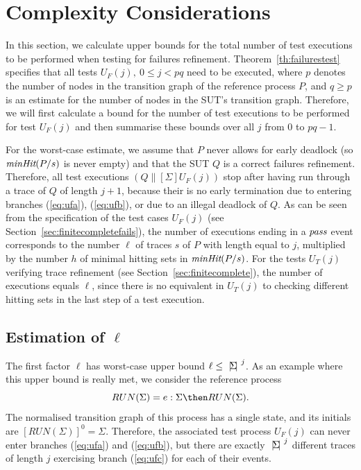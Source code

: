 \section{Complexity Considerations}
\label{sec:complexity}

In this section, we calculate upper bounds for the total number of test
executions to be performed when testing for failures refinement.
Theorem~\ref{th:failurestest} specifies that all tests $U_F(j),\ 0\le j < pq$
need to be executed, where $p$ denotes the number of nodes in the transition
graph of the reference process $P$, and $q\ge p$ is an estimate for the
number of nodes in the SUT's transition graph. Therefore, we will first
calculate a bound for the number of test executions to be performed for test
$U_F(j)$ and then summarise  these bounds over all $j$ from $0$ to $pq-1$.

For the worst-case estimate, we assume that $P$ never allows for early
deadlock (so $\text{\it minHit}(P/s)$ is never empty) and that the SUT $Q$ is a
correct failures refinement. Therefore, all test executions
$(Q\parallel[\Sigma] U_F(j))$ stop after having run through a trace of $Q$ of
length $j+1$, because their is no early termination due to entering branches
(\ref{eq:ufa}), (\ref{eq:ufb}), or due to an illegal deadlock of $Q$. As can
be seen from the specification of the test cases $U_F(j)$ (see
Section~\ref{sec:finitecompletefails}), the number of executions ending in a
${\text{\it pass}}$ event corresponds to the number $\ell$ of traces $s$ of $P$ with
length equal to $j$, multiplied by the number $h$ of minimal hitting sets in
$\text{\it minHit}(P/s)$. For the tests $U_T(j)$ verifying trace refinement (see
Section~\ref{sec:finitecomplete}), the number of executions equals $\ell$,
since there is no equivalent in $U_T(j)$ to checking different hitting sets
in the last step of a test execution.  

\subsection{Estimation of $\ell$}
The first factor $\ell$ has worst-case upper bound $\ell\le {~|\! \Sigma\!|~}^j$.
As an example where this upper bound is really met, we consider the reference
process
\[
RUN(\Sigma) = e:\Sigma \then RUN(\Sigma).
\]
The normalised transition graph of this process has a single state, and its initials
are $[RUN(\Sigma)]^0 = \Sigma$. Therefore, the associated test process $U_F(j)$ can
never enter branches (\ref{eq:ufa}) and (\ref{eq:ufb}), but there are exactly
${~|\! \Sigma\!|~}^j$ different traces of length $j$ exercising branch (\ref{eq:ufc})
for each of their events.

